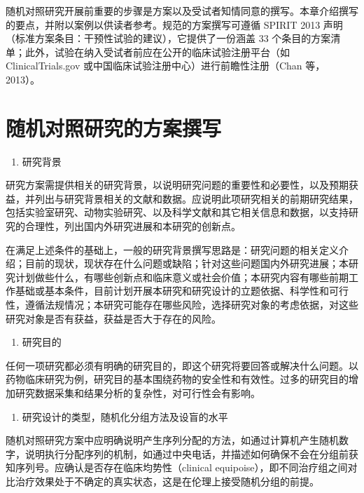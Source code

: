 \documentclass[
  chinese-hans,
  letterpaper,
  DIV=11,
  numbers=noendperiod]{scrreprt}
\providecommand{\tightlist}{%
  \setlength{\itemsep}{0pt}\setlength{\parskip}{0pt}}
\begin{document}
随机对照研究开展前重要的步骤是方案以及受试者知情同意的撰写。本章介绍撰写的要点，并附以案例以供读者参考。规范的方案撰写可遵循
SPIRIT 2013 声明（标准方案条目：干预性试验的建议），它提供了一份涵盖 33
个条目的方案清单；此外，试验在纳入受试者前应在公开的临床试验注册平台（如
ClinicalTrials.gov 或中国临床试验注册中心）进行前瞻性注册（Chan
等，2013）。

\section{随机对照研究的方案撰写}\label{ux968fux673aux5bf9ux7167ux7814ux7a76ux7684ux65b9ux6848ux64b0ux5199}

\begin{enumerate}
\def\labelenumi{\arabic{enumi}.}
\tightlist
\item
  研究背景
\end{enumerate}

研究方案需提供相关的研究背景，以说明研究问题的重要性和必要性，以及预期获益，并列出与研究背景相关的文献和数据。应说明此项研究相关的前期研究结果，包括实验室研究、动物实验研究、以及科学文献和其它相关信息和数据，以支持研究的合理性，列出国内外研究进展和本研究的创新点。

在满足上述条件的基础上，一般的研究背景撰写思路是：研究问题的相关定义介绍；目前的现状，现状存在什么问题或缺陷；针对这些问题国内外研究进展；本研究计划做些什么，有哪些创新点和临床意义或社会价值；本研究内容有哪些前期工作基础或基本条件，目前计划开展本研究和研究设计的立题依据、科学性和可行性，遵循法规情况；本研究可能存在哪些风险，选择研究对象的考虑依据，对这些研究对象是否有获益，获益是否大于存在的风险。

\begin{enumerate}
\def\labelenumi{\arabic{enumi}.}
\setcounter{enumi}{1}
\tightlist
\item
  研究目的
\end{enumerate}

任何一项研究都必须有明确的研究目的，即这个研究将要回答或解决什么问题。以药物临床研究为例，研究目的基本围绕药物的安全性和有效性。过多的研究目的增加研究数据采集和结果分析的复杂性，对可行性会有影响。

\begin{enumerate}
\def\labelenumi{\arabic{enumi}.}
\setcounter{enumi}{2}
\tightlist
\item
  研究设计的类型，随机化分组方法及设盲的水平
\end{enumerate}

随机对照研究方案中应明确说明产生序列分配的方法，如通过计算机产生随机数字，说明执行分配序列的机制，如通过中央电话，并描述如何确保不会在分组前获知序列号。应确认是否存在临床均势性（clinical
equipoise），即不同治疗组之间对比治疗效果处于不确定的真实状态，这是在伦理上接受随机分组的前提。
\end{document}
